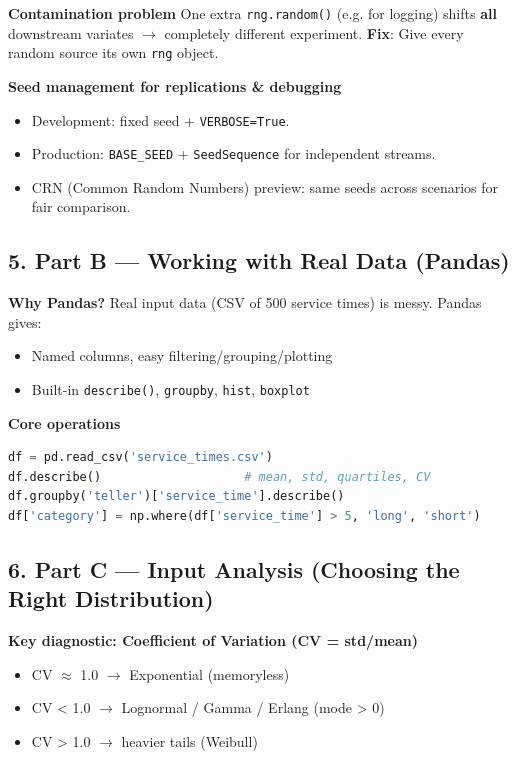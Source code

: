 \documentclass[11pt]{article}
\begin{document}
\textbf{Contamination problem}
One extra \texttt{rng.random()} (e.g. for logging) shifts \textbf{all} downstream variates $\rightarrow$ completely different experiment.  
\textbf{Fix}: Give every random source its own \texttt{rng} object.

\textbf{Seed management for replications \& debugging}
\begin{itemize}[leftmargin=*]
\item Development: fixed seed + \texttt{VERBOSE=True}.
\item Production: \texttt{BASE\_SEED} + \texttt{SeedSequence} for independent streams.
\item CRN (Common Random Numbers) preview: same seeds across scenarios for fair comparison.
\end{itemize}

\subsection*{5. Part B --- Working with Real Data (Pandas)}

\textbf{Why Pandas?}
Real input data (CSV of 500 service times) is messy. Pandas gives:
\begin{itemize}[leftmargin=*]
\item Named columns, easy filtering/grouping/plotting
\item Built-in \texttt{describe()}, \texttt{groupby}, \texttt{hist}, \texttt{boxplot}
\end{itemize}

\textbf{Core operations}
\begin{lstlisting}[language=Python]
df = pd.read_csv('service_times.csv')
df.describe()                    # mean, std, quartiles, CV
df.groupby('teller')['service_time'].describe()
df['category'] = np.where(df['service_time'] > 5, 'long', 'short')
\end{lstlisting}

\subsection*{6. Part C --- Input Analysis (Choosing the Right Distribution)}

\textbf{Key diagnostic: Coefficient of Variation (CV = std/mean)}
\begin{itemize}[leftmargin=*]
\item CV $\approx$ 1.0 $\rightarrow$ Exponential (memoryless)
\item CV < 1.0 $\rightarrow$ Lognormal / Gamma / Erlang (mode > 0)
\item CV > 1.0 $\rightarrow$ heavier tails (Weibull)
\end{itemize}
\end{document}
